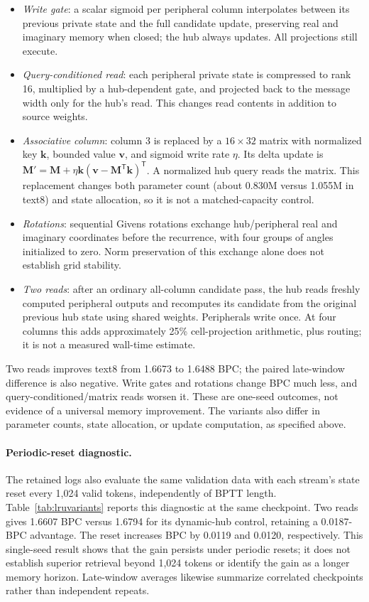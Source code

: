 \documentclass[letterpaper,twoside]{article}
\begin{document}
\begin{itemize}
\item \emph{Write gate}: a scalar sigmoid per peripheral column interpolates between its previous private state and the full candidate update, preserving real and imaginary memory when closed; the hub always updates. All projections still execute.
\item \emph{Query-conditioned read}: each peripheral private state is compressed to rank 16, multiplied by a hub-dependent gate, and projected back to the message width only for the hub's read. This changes read contents in addition to source weights.
\item \emph{Associative column}: column 3 is replaced by a $16\times32$ matrix with normalized key $\mathbf{k}$, bounded value $\mathbf{v}$, and sigmoid write rate $\eta$. Its delta update is $\mathbf{M}'=\mathbf{M}+\eta\mathbf{k}(\mathbf{v}-\mathbf{M}^{\mathsf T}\mathbf{k})^{\mathsf T}$. A normalized hub query reads the matrix. This replacement changes both parameter count (about 0.830M versus 1.055M in text8) and state allocation, so it is not a matched-capacity control.
\item \emph{Rotations}: sequential Givens rotations exchange hub/peripheral real and imaginary coordinates before the recurrence, with four groups of angles initialized to zero. Norm preservation of this exchange alone does not establish grid stability.
\item \emph{Two reads}: after an ordinary all-column candidate pass, the hub reads freshly computed peripheral outputs and recomputes its candidate from the original previous hub state using shared weights. Peripherals write once. At four columns this adds approximately 25\% cell-projection arithmetic, plus routing; it is not a measured wall-time estimate.
\end{itemize}



Two reads improves text8 from 1.6673 to 1.6488 BPC; the paired late-window difference is also negative. Write gates and rotations change BPC much less, and query-conditioned/matrix reads worsen it. These are one-seed outcomes, not evidence of a universal memory improvement. The variants also differ in parameter counts, state allocation, or update computation, as specified above.

\paragraph{Periodic-reset diagnostic.}
The retained logs also evaluate the same validation data with each stream's state reset every 1,024 valid tokens, independently of BPTT length. Table~\ref{tab:lruvariants} reports this diagnostic at the same checkpoint. Two reads gives 1.6607 BPC versus 1.6794 for its dynamic-hub control, retaining a 0.0187-BPC advantage. The reset increases BPC by 0.0119 and 0.0120, respectively. This single-seed result shows that the gain persists under periodic resets; it does not establish superior retrieval beyond 1,024 tokens or identify the gain as a longer memory horizon. Late-window averages likewise summarize correlated checkpoints rather than independent repeats.
\end{document}
